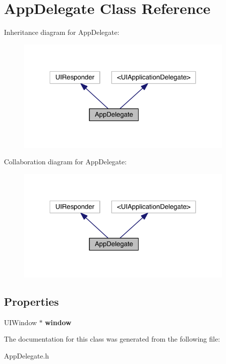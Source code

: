 \section{App\+Delegate Class Reference}
\label{interface_app_delegate}


Inheritance diagram for App\+Delegate\+:
\nopagebreak
\begin{figure}[H]
\begin{center}
\leavevmode
\includegraphics[width=299pt]{interface_app_delegate__inherit__graph}
\end{center}
\end{figure}


Collaboration diagram for App\+Delegate\+:
\nopagebreak
\begin{figure}[H]
\begin{center}
\leavevmode
\includegraphics[width=299pt]{interface_app_delegate__coll__graph}
\end{center}
\end{figure}
\subsection*{Properties}
\begin{DoxyCompactItemize}
\item 
U\+I\+Window $\ast$ {\bfseries window}\label{interface_app_delegate_acf48ac24125e688cac1a85445cd7fac2}

\end{DoxyCompactItemize}


The documentation for this class was generated from the following file\+:\begin{DoxyCompactItemize}
\item 
App\+Delegate.\+h\end{DoxyCompactItemize}
